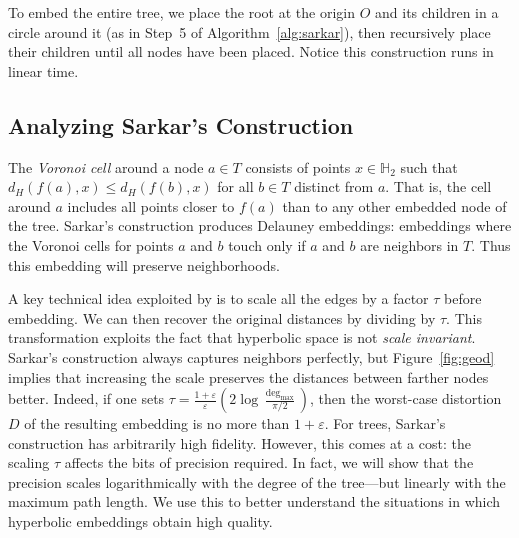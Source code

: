 To embed the entire tree, we place the root at the origin $O$ and its children in a circle around it (as in Step~5 of Algorithm~\ref{alg:sarkar}), then recursively place their children until all nodes have been placed. Notice this construction runs in linear time.

\subsection{Analyzing Sarkar's Construction}
\label{sec:sarkar}
The \emph{Voronoi cell} around a node $a \in T$ consists of points $x \in \mathbb{H}_2$ such that $d_H(f(a),x) \leq d_H(f(b),x)$ for all $b \in T$ distinct from $a$. That is, the cell around $a$ includes all points closer to $f(a)$ than to any other embedded node of the tree. Sarkar's construction produces Delauney embeddings: embeddings where the Voronoi cells for points $a$ and $b$ touch only if $a$ and $b$ are neighbors in $T$. Thus this embedding will preserve neighborhoods.

A key technical idea exploited by \citet{sarkar} is to scale all the
edges by a factor $\tau$ before embedding. We can then recover the original distances
by dividing by $\tau$. This transformation exploits the fact that
hyperbolic space is not {\em scale invariant}.
Sarkar's construction always captures neighbors perfectly, but Figure~\ref{fig:geod} implies that increasing the scale preserves the distances between farther nodes better.
Indeed, if one sets
$\tau
= \frac{1+\varepsilon}{\varepsilon}\left(2\log \frac{\operatorname{deg}_{\max}}{\pi
/2}\right)$, then the worst-case distortion $D$ of the resulting embedding is no more than
$1+\varepsilon$. For trees, Sarkar's construction has arbitrarily high
fidelity. However, this comes at a cost: the scaling $\tau$ affects
the bits of precision required. In fact, we will show that the
precision scales logarithmically with the degree of the tree---but linearly with the maximum path length. We use
this to better understand the situations in which hyperbolic
embeddings obtain high quality.




